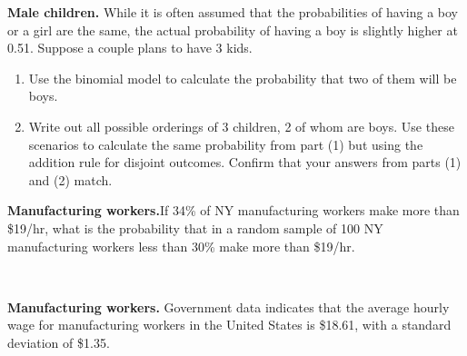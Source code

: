 \documentclass[12pt]{article}
\newcommand{\soln}[2]{$\:$\\ \vspace{#1}}{}
\newcommand{\qt}[1]{\textcolor{custom_carnelian}{\textbf{#1.}}}
\begin{document}


\qt{Male children\label{male_children}} While it is often assumed that the 
probabilities of having a boy or a girl are the same, the actual probability 
of having a boy is slightly higher at 0.51. Suppose a couple plans to have 3 
kids. 
\begin{enumerate}
\item Use the binomial model to calculate the probability that two of them 
will be boys.

\vspace{1cm}
\item Write out all possible orderings of 3 children, 2 of whom are boys. Use 
these scenarios to calculate the same probability from part (1) but using the 
addition rule for disjoint outcomes. Confirm that your answers from parts (1) 
and (2) match.

\vspace{3cm}
\end{enumerate}


\qt{Manufacturing workers\label{manufacturing_avg}}If 34\% of NY manufacturing workers make more than \$19/hr, what is the probability that in a random sample of 100 NY manufacturing workers less than 30\% make more than \$19/hr.

\soln{2cm}{
$p = 0.34$, $n = 100$ \\
S/F: checks \\
$\mu = 0.34 \times 100 = 34$ and $\sigma = \sqrt{100 \times 0.34 \times 0.66} = 4.74$ \\
$P \left( K < 30 \right) = P \left( Z < \frac{30 - 34}{4.74} \right) = P(Z < -0.84) = 0.2$
}



\clearpage

\qt{Manufacturing workers\label{manufacturing_avg}} Government data indicates that the average hourly wage for manufacturing workers in the United States is \$18.61, 
with a standard deviation of \$1.35. 
\end{document}
